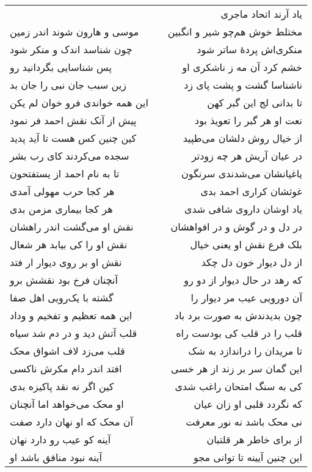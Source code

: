 \begin{center}
\begin{longtable}{l p{0.5cm} r}
&&
یاد آرند اتحاد ماجری
\\
موسی و هارون شوند اندر زمین
&&
مختلط خوش هم‌چو شیر و انگبین
\\
چون شناسد اندک و منکر شود
&&
منکری‌اش پردهٔ ساتر شود
\\
پس شناسایی بگردانید رو
&&
خشم کرد آن مه ز ناشکری او
\\
زین سبب جان نبی را جان بد
&&
ناشناسا گشت و پشت پای زد
\\
این همه خواندی فرو خوان لم یکن
&&
تا بدانی لج این گبر کهن
\\
پیش از آنک نقش احمد فر نمود
&&
نعت او هر گبر را تعویذ بود
\\
کین چنین کس هست تا آید پدید
&&
از خیال روش دلشان می‌طپید
\\
سجده می‌کردند کای رب بشر
&&
در عیان آریش هر چه زودتر
\\
تا به نام احمد از یستفتحون
&&
یاغیانشان می‌شدندی سرنگون
\\
هر کجا حرب مهولی آمدی
&&
غوثشان کراری احمد بدی
\\
هر کجا بیماری مزمن بدی
&&
یاد اوشان داروی شافی شدی
\\
نقش او می‌گشت اندر راهشان
&&
در دل و در گوش و در افواهشان
\\
نقش او را کی بیابد هر شعال
&&
بلک فرع نقش او یعنی خیال
\\
نقش او بر روی دیوار ار فتد
&&
از دل دیوار خون دل چکد
\\
آنچنان فرخ بود نقشش برو
&&
که رهد در حال دیوار از دو رو
\\
گشته با یک‌رویی اهل صفا
&&
آن دورویی عیب مر دیوار را
\\
این همه تعظیم و تفخیم و وداد
&&
چون بدیدندش به صورت برد باد
\\
قلب آتش دید و در دم شد سیاه
&&
قلب را در قلب کی بودست راه
\\
قلب می‌زد لاف اشواق محک
&&
تا مریدان را دراندازد به شک
\\
افتد اندر دام مکرش ناکسی
&&
این گمان سر بر زند از هر خسی
\\
کین اگر نه نقد پاکیزه بدی
&&
کی به سنگ امتحان راغب شدی
\\
او محک می‌خواهد اما آنچنان
&&
که نگردد قلبی او زان عیان
\\
آن محک که او نهان دارد صفت
&&
نی محک باشد نه نور معرفت
\\
آینه کو عیب رو دارد نهان
&&
از برای خاطر هر قلتبان
\\
آینه نبود منافق باشد او
&&
این چنین آیینه تا توانی مجو
\\
\end{longtable}
\end{center}
